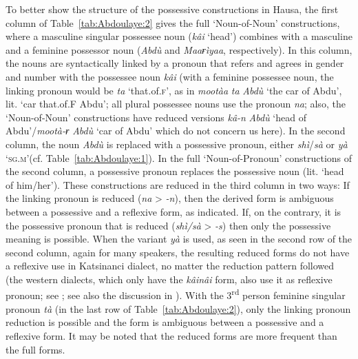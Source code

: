 \documentclass[output=paper]{langscibook}
\begin{document}
To better show the structure of the possessive constructions in Hausa, the first column of Table~\ref{tab:Abdoulaye:2} gives the full ‘Noun-of-Noun’ constructions, where a masculine singular possessee noun (\textit{kâi} ‘head’) combines with a masculine and a feminine possessor noun (\textit{Abdù} and \textit{Maaɍìyaa}, respectively). In this column, the nouns are syntactically linked by a pronoun that refers and agrees in gender and number with the possessee noun \textit{kâi} (with a feminine possessee noun, the linking pronoun would be \textit{ta} ‘that.of.\textsc{f}’, as in \textit{mootàa} \textit{ta} \textit{Abdù} ‘the car of Abdu’, lit. ‘car that.of.F Abdu’; all plural possessee nouns use the pronoun \textit{na}; also, the ‘Noun-of-Noun’ constructions have reduced versions \textit{kâ-n} \textit{Abdù} ‘head of Abdu’/\textit{mootà-ɍ} \textit{Abdù} ‘car of Abdu’ which do not concern us here). In the second column, the noun \textit{Abdù} is replaced with a possessive pronoun, either \textit{shì}/\textit{sà} or \textit{yà} ‘\textsc{sg.m}’(cf. Table~\ref{tab:Abdoulaye:1}). In the full ‘Noun-of-Pronoun’ constructions of the second column, a possessive pronoun replaces the possessive noun (lit. ‘head of him/her’). These constructions are reduced in the third column in two ways: If the linking pronoun is reduced (\textit{na} > \textit{\nobreakdash-n}), then the derived form is ambiguous between a possessive and a reflexive form, as indicated. If, on the contrary, it is the possessive pronoun that is reduced (\textit{shì/sà} > \textit{\nobreakdash-s}) then only the possessive meaning is possible. When the variant \textit{yà} is used, as seen in the second row of the second column, again for many speakers, the resulting reduced forms do not have a reflexive use in Katsinanci dialect, no matter the reduction pattern followed (the western dialects, which only have the \textit{kâinâi} form, also use it as reflexive pronoun; see \citealt[74]{Caron1991}; see also the discussion in ). With the 3\textsuperscript{rd} person feminine singular pronoun \textit{tà} (in the last row of Table~\ref{tab:Abdoulaye:2}), only the linking pronoun reduction is possible and the form is ambiguous between a possessive and a reflexive form. It may be noted that the reduced forms are more frequent than the full forms.
\end{document}
